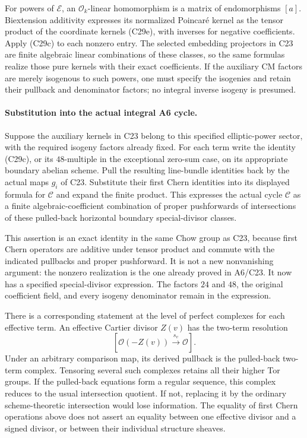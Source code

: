 \documentclass[11pt]{article}
\theoremstyle{definition}\newtheorem{definition}[theorem]{Definition}\newtheorem{remark}[theorem]{Remark}
\begin{document}
For powers of $\mathcal E$, an
$\mathcal O_k$-linear homomorphism is a matrix of
endomorphisms $[a]$. Biextension additivity expresses
its normalized Poincar\'e kernel as the tensor product
of the coordinate kernels (C29e), with inverses for
negative coefficients. Apply (C29c) to each nonzero
entry. The selected embedding projectors in C23 are
finite algebraic linear combinations of these classes,
so the same formulas realize those pure kernels with
their exact coefficients. If the auxiliary CM factors
are merely isogenous to such powers, one must specify
the isogenies and retain their pullback and denominator
factors; no integral inverse isogeny is presumed.

\paragraph{Substitution into the actual integral A6 cycle.}
Suppose the auxiliary kernels in C23 belong to this
specified elliptic-power sector, with the required
isogeny factors already fixed. For each term write the
identity (C29c), or its $48$-multiple in the exceptional
zero-sum case, on its appropriate boundary abelian
scheme. Pull the resulting line-bundle identities back
by the actual maps $g_i$ of C23. Substitute their first
Chern identities into its displayed formula for
$\mathcal C$ and expand the finite product.
This expresses the actual cycle $\mathcal C$ as a
finite algebraic-coefficient combination of proper
pushforwards of intersections of these pulled-back
horizontal boundary special-divisor classes.

This assertion is an exact identity in the same Chow
group as C23, because first Chern operators are additive
under tensor product and commute with the indicated
pullbacks and proper pushforward. It is not a new
nonvanishing argument: the nonzero realization is the
one already proved in A6/C23. It now has a specified
special-divisor expression. The factors $24$ and $48$,
the original coefficient field, and every isogeny
denominator remain in the expression.

There is a corresponding statement at the level of
perfect complexes for each effective term. An effective
Cartier divisor $Z(v)$ has the two-term resolution
\[
          [\mathcal O(-Z(v))\xrightarrow{s_v}\mathcal O].
\]
Under an arbitrary comparison map, its derived pullback
is the pulled-back two-term complex. Tensoring several
such complexes retains all their higher Tor groups.
If the pulled-back equations form a regular sequence,
this complex reduces to the usual intersection quotient.
If not, replacing it by the ordinary scheme-theoretic
intersection would lose information. The equality of
first Chern operations above does not assert an equality
between one effective divisor and a signed divisor, or
between their individual structure sheaves.
\end{document}
